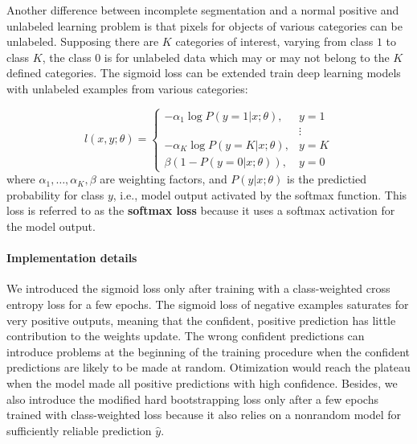 Another difference between incomplete segmentation and a normal positive and unlabeled learning problem is that pixels for objects of various categories can be unlabeled.
Supposing there are $K$ categories of interest, varying from class $1$ to class $K$, the class $0$ is for unlabeled data which may or may not belong to the $K$ defined categories.
The sigmoid loss can be extended train deep learning models with unlabeled examples from various categories:

\[
  l(x, y; \theta) =
    \begin{cases}
      - \alpha_1 \log P(y=1 \vert x; \theta), & y = 1 \\
                                              & \vdots \\
      - \alpha_K \log P(y=K \vert x; \theta), & y = K \\
      \beta (1 - P(y=0 \vert x; \theta)), & y = 0
    \end{cases}
\]
where $\alpha_1, \dots, \alpha_K, \beta$ are weighting factors, and $P(y \vert x; \theta)$ is the predictied probability for class $y$, i.e., model output activated by the softmax function.
This loss is referred to as the \textbf{softmax loss} because it uses a softmax activation for the model output.


\paragraph{Implementation details}
We introduced the sigmoid loss only after training with a class-weighted cross entropy loss for a few epochs.
The sigmoid loss of negative examples saturates for very positive outputs, meaning that the confident, positive prediction has little contribution to the weights update.
The wrong confident predictions can introduce problems at the beginning of the training procedure when the confident predictions are likely to be made at random.
Otimization would reach the plateau when the model made all positive predictions with high confidence.
Besides, we also introduce the modified hard bootstrapping loss only after a few epochs trained with class-weighted loss because it also relies on a nonrandom model for sufficiently reliable prediction $\hat{y}$.


